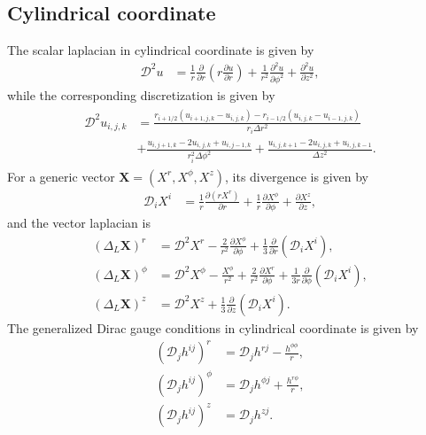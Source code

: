 \subsection{Cylindrical coordinate}
The scalar laplacian in cylindrical coordinate is given by
\begin{align}
    \mathcal{D}^2 u &= \frac{1}{r}\frac{\partial }{\partial r} \left( r \frac{\partial u}{\partial r}\right)
            + \frac{1}{r^2} \frac{\partial^2 u}{\partial \phi^2} 
            + \frac{\partial^2 u}{\partial z^2},
\end{align}
while the corresponding discretization is given by
\begin{align}
\begin{split}
    \mathcal{D}^2 u_{i,j,k} &= \frac{ r_{i+1/2} \left(u_{i+1,j,k} - u_{i,j,k} \right)
            - r_{i-1/2} \left(u_{i,j,k} - u_{i-1,j,k} \right)}{r_i \Delta r^2} \\
            &+ \frac{ u_{i,j+1,k} - 2 u_{i,j,k} + u_{i,j-1,k}}{r_i^2 \Delta \phi^2}
            + \frac{ u_{i,j,k+1} - 2 u_{i,j,k} + u_{i,j,k-1}}{\Delta z^2}.
\end{split}
\end{align}
For a generic vector $\mathbf{X} = \left(X^r, X^\phi, X^z \right)$, its divergence is given by
\begin{align}
    \mathcal{D}_i X^i &= \frac{1}{r}\frac{\partial \left(r X^r\right)}{\partial r} + \frac{1}{r}\frac{\partial X^\phi}{\partial \phi}
            + \frac{\partial X^z}{\partial z},
\end{align}
and the vector laplacian is
\begin{align}
    \left(\Delta_L \mathbf{X}\right)^r &= \mathcal{D}^2 X^r - \frac{2}{r^2}\frac{\partial X^\phi}{\partial \phi}
            + \frac{1}{3}\frac{\partial}{\partial r}\left( \mathcal{D}_i X^i \right), \\
    \left(\Delta_L \mathbf{X}\right)^\phi &= \mathcal{D}^2 X^\phi - \frac{X^\phi}{r^2} + \frac{2}{r^2}\frac{\partial X^r}{\partial \phi}
            + \frac{1}{3 r}\frac{\partial}{\partial \phi}\left( \mathcal{D}_i X^i \right), \\
    \left(\Delta_L \mathbf{X}\right)^z &= \mathcal{D}^2 X^z + \frac{1}{3}\frac{\partial}{\partial z}\left( \mathcal{D}_i X^i \right).
\end{align}
The generalized Dirac gauge conditions in cylindrical coordinate is given by
\begin{align}
    \left(\mathcal{D}_j h^{ij}\right)^r &= \mathcal{D}_j h^{rj} - \frac{h^{\phi\phi}}{r}, \\
    \left(\mathcal{D}_j h^{ij}\right)^\phi &= \mathcal{D}_j h^{\phi j} + \frac{h^{r\phi}}{r}, \\
    \left(\mathcal{D}_j h^{ij}\right)^z &= \mathcal{D}_j h^{z j}.
\end{align}

